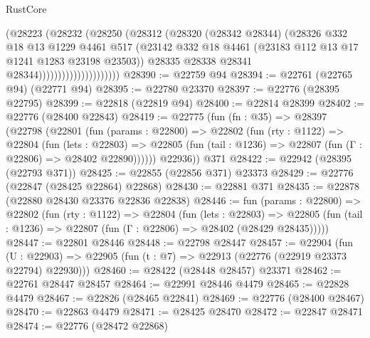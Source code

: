 \begin{lexlean}{RustCore}
\begin{coremodule}
                                  (@28223
                                    (@28232
                                      (@28250
                                        (@28312
                                          (@28320
                                            (@28342 @28344)
                                            (@28326
                                              @332
                                              @18
                                              @13
                                              @1229
                                              @4461
                                              @517
                                              (@23142
                                                @332
                                                @18
                                                @4461
                                                (@23183 @112 @13 @17 @1241 @1283 @23198 @23503))
                                              @28335
                                              @28338
                                              @28341
                                              @28344)))))))))))))))))))))
@28390 := @22759 @94
@28394 := @22761 (@22765 @94) (@22771 @94)
@28395 := @22780 @23370
@28397 := @22776 (@28395 @22795)
@28399 := @22818 (@22819 @94)
@28400 := @22814 @28399
@28402 := @22776 (@28400 @22843)
@28419 := @22775
    (fun (fn : @35) =>
    @28397
      (@22798
        (@22801
          (fun (params : @22800) =>
          @22802
            (fun (rty : @1122) =>
            @22804
              (fun (lets : @22803) =>
              @22805 (fun (tail : @1236) => @22807 (fun (Γ : @22806) => @28402 @22890))))))
        @22936))
    @371
@28422 := @22942 (@28395 (@22793 @371))
@28425 := @22855 (@22856 @371) @23373
@28429 := @22776 (@22847 (@28425 @22864) @22868)
@28430 := @22881 @371
@28435 := @22878 (@22880 @28430 @23376 @22836 @22838)
@28446 := fun (params : @22800) =>
  @22802
    (fun (rty : @1122) =>
    @22804
      (fun (lets : @22803) =>
      @22805 (fun (tail : @1236) => @22807 (fun (Γ : @22806) => @28402 (@28429 @28435)))))
@28447 := @22801 @28446
@28448 := @22798 @28447
@28457 := @22904
    (fun (U : @22903) => @22905 (fun (t : @7) => @22913 (@22776 (@22919 @23373 @22794) @22930)))
@28460 := @28422 (@28448 @28457) @23371
@28462 := @22761 @28447 @28457
@28464 := @22991 @28446 @4479
@28465 := @22828 @4479
@28467 := @22826 (@28465 @22841)
@28469 := @22776 (@28400 @28467)
@28470 := @22863 @4479
@28471 := @28425 @28470
@28472 := @22847 @28471
@28474 := @22776 (@28472 @22868)

\end{coremodule}
\end{lexlean}
